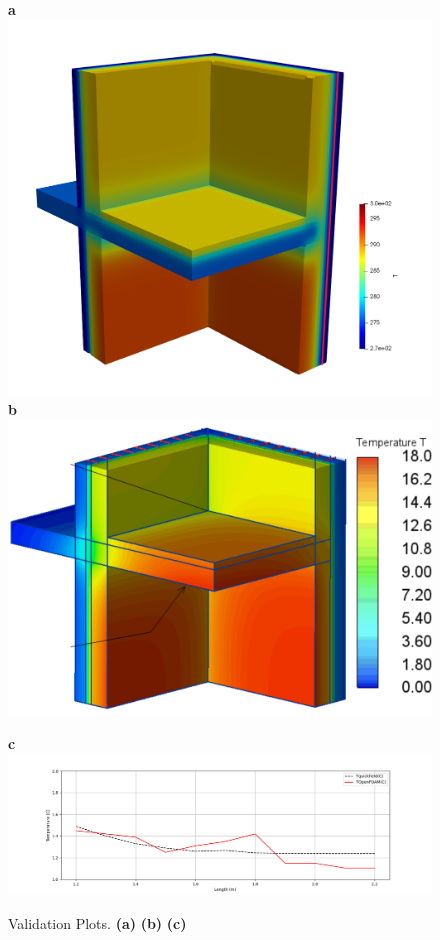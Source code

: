 \begin{figure}[tbh]
    \centering
    \textbf{a}\includegraphics[width=0.65\columnwidth]{Figures/casewoutair.png}
    \textbf{b}\includegraphics[width=0.65\columnwidth]{Figures/ValidationCaseClean.png}


    
     \textbf{c}\includegraphics[width=1\columnwidth, clip = true]{Figures/Figure_2.png}
    \caption[3D Validation Plots]{Validation Plots. \textbf{(a)} \textbf{(b)}  \textbf{(c)} }
    \label{fig:validation-plots}
\end{figure}






